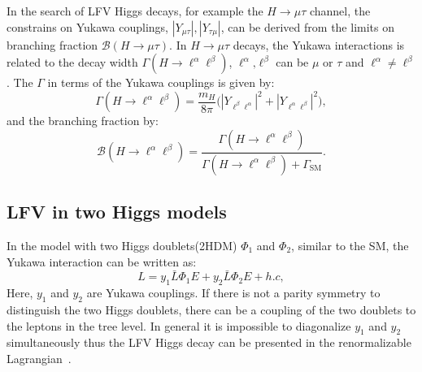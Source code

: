 In the search of LFV Higgs decays, for example the $H\to \mu\tau$ channel, the constrains on Yukawa couplings, $|Y_{\mu\tau}|, |Y_{\tau\mu}|$, can be derived from the limits on branching fraction $\mathcal{B}(H \to \mu \tau)$. In $H \to \mu \tau$ decays, the Yukawa interactions is related to the decay width  $\Gamma(H \to \ell^{\alpha}\ell^{\beta})$,  $\ell^{\alpha}\textrm{,}\ell^{\beta}$ can be $\mu$ or $\tau$ and $\ell^{\alpha} \neq \ell^{\beta}$. The $\Gamma$ in terms of the Yukawa couplings is given by:
\begin{equation}  
\Gamma(H \to \ell^{\alpha}\ell^{\beta})=\frac{m_{H}}{8\pi}\bigl(|Y_{\ell^{\beta}\ell^{\alpha}}|^2 + |Y_{\ell^{\alpha}\ell^{\beta}}|^2\bigr),\label{eq:Yukawa}
\end{equation}
and the branching fraction by:
\begin{equation}
\mathcal{B}(H \to \ell^{\alpha}\ell^{\beta})=\frac{\Gamma(H\to \ell^{\alpha}\ell^{\beta})}{\Gamma(H\to \ell^{\alpha}\ell^{\beta}) + \Gamma_{\mathrm{SM}}}. \label{eq:Branchingfraction}
\end{equation}



\subsection{LFV in two Higgs models}

In the model with two Higgs doublets(2HDM) $\Phi_{1}$ and $\Phi_{2}$, similar to the SM, the Yukawa interaction can be written as: 
\begin{equation}
L=y_{1}\bar{L}\Phi_{1}E+y_{2}\bar{L}\Phi_{2}E+h.c,
\end{equation}
Here, $y_{1}$ and $y_{2}$ are Yukawa couplings. If there is not a parity symmetry to distinguish the two Higgs doublets, there can be a coupling of the two doublets to the leptons in the tree level. In general it is impossible to diagonalize $y_{1}$ and $y_{2}$ simultaneously thus the LFV Higgs decay can be presented in the renormalizable Lagrangian~\cite{deLima2015}.%


